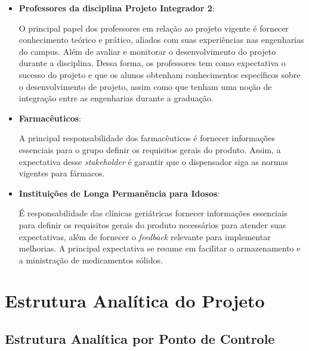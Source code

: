 \begin{apendicesenv}
\begin{itemize}
\item \textbf{Professores da disciplina Projeto Integrador 2}:

O principal papel dos professores em relação ao projeto vigente é fornecer conhecimento teórico e prático, aliados com suas experiências nas engenharias do campus. Além de avaliar e monitorar o desenvolvimento do projeto durante a disciplina. Dessa forma, os professores tem como expectativa o sucesso do projeto e que os alunos obtenham conhecimentos específicos sobre o desenvolvimento de projeto, assim como que tenham uma noção de integração entre as engenharias durante a graduação.
\item \textbf{Farmacêuticos}:

A principal responsabilidade dos farmacêuticos é fornecer informações essenciais para o grupo definir os requisitos gerais do produto. Assim, a expectativa desse \textit{stakeholder} é garantir que o dispensador siga as normas vigentes para fármacos.

\item \textbf{Instituições de Longa Permanência para Idosos}:

É responsabilidade das clínicas geriátricas fornecer informações essenciais para definir os requisitos gerais do produto necessários para atender suas expectativas, além de fornecer o \textit{feedback} relevante para implementar melhorias.  A principal expectativa se resume em facilitar o armazenamento e a ministração de medicamentos sólidos.
\end{itemize}



\chapter{Estrutura Analítica do Projeto}
\label{EAP_app}
\section{Estrutura Analítica por Ponto de Controle}


\end{apendicesenv}
